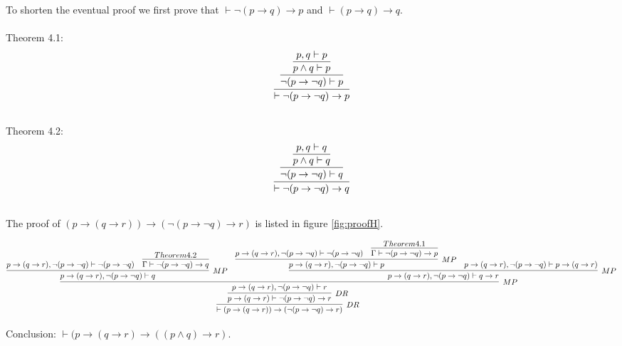 \documentclass[]{article}
\begin{document}
\noindent To shorten the eventual proof we first prove that $\vdash \neg (p \rightarrow q) \rightarrow p$ and $\vdash (p \rightarrow q) \rightarrow q$. \\ \\
\noindent Theorem 4.1:
$$
\infer
	{\vdash \neg(p \rightarrow \neg q) \rightarrow p}
	{\infer
		{\neg (p \rightarrow \neg q) \vdash p}
		{\infer
			{p \wedge q \vdash p}
			{p, q \vdash p}
		}
	}
$$\\

\noindent Theorem 4.2:
$$
\infer
	{\vdash \neg(p \rightarrow \neg q) \rightarrow q}
	{\infer
		{\neg (p \rightarrow \neg q) \vdash q}
		{\infer
			{p \wedge q \vdash q}
			{p, q \vdash q}
		}
	}
$$\\

\noindent The proof of $(p \rightarrow (q \rightarrow r)) \rightarrow (\neg (p \rightarrow \neg q) \rightarrow r)$ is listed in figure \ref{fig:proofH}. \\

\begin{sidewaysfigure}
    \centering
\begingroup\makeatletter{}\check@mathfonts
$$
\infer[DR]{\vdash (p \rightarrow (q \rightarrow r)) \rightarrow (\neg (p \rightarrow \neg q) \rightarrow r)}{
	\infer[DR] {p \rightarrow (q \rightarrow r) \vdash \neg (p \rightarrow \neg q) \rightarrow r}{
		\infer[MP]{p \rightarrow (q \rightarrow r), \neg (p \rightarrow \neg q) \vdash  r}{
			\infer[MP]{p \rightarrow (q \rightarrow r), \neg (p \rightarrow \neg q) \vdash q}{
				p \rightarrow (q \rightarrow r), \neg (p \rightarrow \neg q) \vdash \neg (p \rightarrow \neg q)
				&
				\infer{\Gamma \vdash \neg (p \rightarrow \neg q) \rightarrow q}{
					Theorem 4.2
				}
			}
			&
			\infer[MP]{p \rightarrow (q \rightarrow r), \neg (p \rightarrow \neg q) \vdash q \rightarrow r}{
				\infer[MP]{p \rightarrow (q \rightarrow r), \neg (p \rightarrow \neg q) \vdash p}{
					p \rightarrow (q \rightarrow r), \neg (p \rightarrow \neg q) \vdash \neg (p \rightarrow \neg q)
					&
					\infer{\Gamma \vdash \neg (p \rightarrow \neg q) \rightarrow p}{
						Theorem 4.1
					}
				}
				&
				p \rightarrow (q \rightarrow r), \neg (p \rightarrow \neg q) \vdash p \rightarrow (q \rightarrow r)
			}
		}
	}
}
$$\endgroup
	\caption{Proof for $(p \rightarrow (q \rightarrow r)) \rightarrow (\neg (p \rightarrow \neg q) \rightarrow r))$ in $H$}
    \label{fig:proofH}
\end{sidewaysfigure}

\noindent Conclusion: $\vdash (p \rightarrow (q \rightarrow r) \rightarrow ((p \wedge q) \rightarrow r)$.
\end{document}
